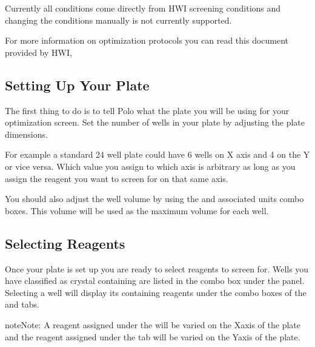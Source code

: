 \documentclass[letterpaper,10pt,english]{sphinxmanual}
\begin{document}
Currently all conditions come directly from HWI screening conditions and changing
the conditions manually is not currently supported.

For more information on
optimization protocols you can read this document provided by HWI,

\begin{quote}

\noindent{}
\end{quote}


\subsection{Setting Up Your Plate}
\label{\detokenize{user_guide:setting-up-your-plate}}
The first thing to do is to tell Polo what the plate you will be using for
your optimization screen. Set the number of wells in your plate by adjusting
the plate dimensions.

For example a standard 24 well plate could have 6 wells on X axis and 4 on
the Y or vice versa. Which value you assign to which axis is arbitrary as
long as you assign the reagent you want to screen for on that same axis.

You should also adjust the well volume by using the  and associated
units combo boxes. This volume will be used as the maximum volume for each well.


\subsection{Selecting Reagents}
\label{\detokenize{user_guide:selecting-reagents}}
Once your plate is set up you are ready to select reagents to screen for.
Wells you have classified as crystal containing are listed in the 
combo box under the  panel. Selecting a well will display
its containing reagents under the  combo boxes of the
 and  tabs.

\begin{sphinxadmonition}{note}{Note:}
A reagent assigned under the  will be varied on the X\sphinxhyphen{}axis of the plate and the reagent assigned under the  tab will be varied on the Y\sphinxhyphen{}axis of the plate.
\end{sphinxadmonition}
\end{document}
